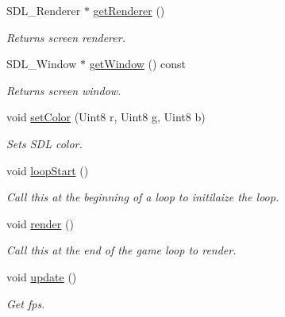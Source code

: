 \begin{DoxyCompactItemize}
\mbox{\label{classEngine_ae42b73be55ab0fa034a0f7dea156cf9c}} 
S\+D\+L\+\_\+\+Renderer $\ast$ \hyperlink{classEngine_ae42b73be55ab0fa034a0f7dea156cf9c}{get\+Renderer} ()
\begin{DoxyCompactList}\small\item\em Returns screen renderer. \end{DoxyCompactList}\item 
\mbox{\label{classEngine_ac54bbc31578a1d5fd14887ceaba73843}} 
S\+D\+L\+\_\+\+Window $\ast$ \hyperlink{classEngine_ac54bbc31578a1d5fd14887ceaba73843}{get\+Window} () const
\begin{DoxyCompactList}\small\item\em Returns screen window. \end{DoxyCompactList}\item 
\mbox{\label{classEngine_aeee842a402f260e38e0502e1d95b920b}} 
void \hyperlink{classEngine_aeee842a402f260e38e0502e1d95b920b}{set\+Color} (Uint8 r, Uint8 g, Uint8 b)
\begin{DoxyCompactList}\small\item\em Sets S\+DL color. \end{DoxyCompactList}\item 
\mbox{\label{classEngine_ad7602820f1b9d75ec1b59f2a6111085e}} 
void \hyperlink{classEngine_ad7602820f1b9d75ec1b59f2a6111085e}{loop\+Start} ()
\begin{DoxyCompactList}\small\item\em Call this at the beginning of a loop to initilaize the loop. \end{DoxyCompactList}\item 
\mbox{\label{classEngine_a7960743aefd62e846e7f3cd92c18bc73}} 
void \hyperlink{classEngine_a7960743aefd62e846e7f3cd92c18bc73}{render} ()
\begin{DoxyCompactList}\small\item\em Call this at the end of the game loop to render. \end{DoxyCompactList}\item 
void \hyperlink{classEngine_ad2ff110d5a86c1cd60b541d65915ac48}{update} ()
\begin{DoxyCompactList}\small\item\em Get fps. \end{DoxyCompactList}\item 

\end{DoxyCompactItemize}
